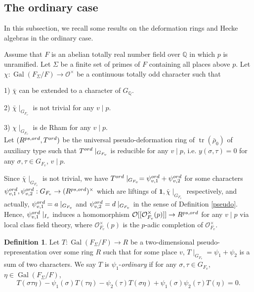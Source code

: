 \documentclass[12pt]{amsart}
\theoremstyle{plain}
\theoremstyle{definition}
\newtheorem{defn}[thm]{Definition}
\theoremstyle{remark}
\begin{document}
\subsection{The ordinary case}\label{sec 3}
In this subsection, we recall some results on the deformation rings and Hecke algebras in the ordinary case.

Assume that $F$ is an abelian totally real number field over $\mathbb{Q}$ in which $p$ is unramified. Let $\Sigma$ be a finite set of primes of $F$ containing all places above $p$. Let $\chi: \operatorname{Gal}(F_{\Sigma}/F) \to \mathcal{O}^{\times}$ be a continuous totally odd character such that 

1) $\bar{\chi}$ can be extended to a character of $G_{\mathbb{Q}}$.

2) $\bar{\chi} \mid_{G_{F_v}}$ is not trivial for any $v \mid p$.

3) $\chi \mid_{G_{F_v}}$ is de Rham for any $v \mid p$.
\\

Let $(R^{\textnormal{ps,ord}}, T^{\textnormal{ord}})$ be the universal pseudo-deformation ring of $\operatorname{tr}(\bar{\rho}_0)$ of auxiliary type such that $ T^{\textnormal{ord}}\mid_{G_{F_v}}$ is reducible for any $v \mid p$, i.e. $y(\sigma, \tau)=0$ for any $\sigma, \tau \in G_{F_v}$, $v \mid p$.

Since $\bar{\chi} \mid_{G_{F_v}}$ is not trivial, we have $T^{\textnormal{ord}}\mid_{G_{F_v}}= \psi_{v,1}^{\textnormal{ord}}+\psi_{v,2}^{\textnormal{ord}}$ for some characters $ \psi_{v,1}^{\textnormal{ord}}, \psi_{v,2}^{\textnormal{ord}}: G_{F_v} \to (R^{\textnormal{ps,ord}})^\times$ which are liftings of $ \textbf{1}, \bar{\chi}\mid_{G_{F_v}}$ respectively, and actually, $\psi_{v,1}^{\textnormal{ord}} = a\mid_{G_{F_v}} $ and $\psi_{v,2}^{\textnormal{ord}} = d\mid_{G_{F_v}} $ in the sense of Definition \ref{pseudo}. Hence, $ \psi_{v,1}^{\textnormal{ord}}\mid_{I_v}$ induces a homomorphism $\mathcal{O}[[\mathcal{O}_{F_v}^\times(p)]] \to R^{\textnormal{ps,ord}}$ for any $v \mid p$ via local class field theory, where $\mathcal{O}_{F_v}^\times(p) $ is the $p$-adic completion of $ \mathcal{O}_{F_v}^\times$.

\begin{defn}\cite[Definition 5.3.1]{pan2022fontaine}
	Let $T: \operatorname{Gal}(F_\Sigma/F) \to R$ be a two-dimensional pseudo-representation over some ring $R$ such that for some place $v$, $T \mid_{G_{F_v}} = \psi_1 + \psi_2$ is a sum of two characters. We say $T$ is $\psi_1$-\textit{ordinary} if for any $\sigma, \tau \in G_{F_v}$, $\eta \in \operatorname{Gal}(F_\Sigma/F)$, $$
	T(\sigma \tau \eta)-\psi_1(\sigma)T(\tau \eta)-\psi_2(\tau)T(\sigma\eta)+\psi_1(\sigma)\psi_2(\tau)T(\eta)=0.$$
\end{defn}
\end{document}
